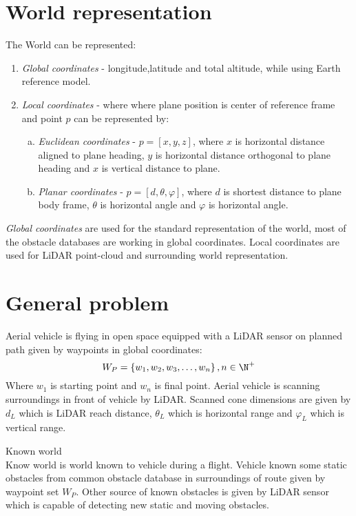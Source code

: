\section{World representation}
The World can be represented:
\begin{enumerate}
    \item \textit {Global coordinates} - longitude,latitude and total altitude, while using Earth reference model.
    \item \textit {Local coordinates} - where where plane position is center of reference frame and point $p$ can be represented by:
    \begin{enumerate}[a.]
        \item \textit{Euclidean coordinates} - $p = [x,y,z]$, where $x$ is horizontal distance aligned to plane heading, $y$ is horizontal distance orthogonal to plane heading and $x$ is vertical distance to plane.
        \item \textit{Planar coordinates} - $p = [d, \theta, \varphi]$, where $d$ is shortest distance to plane body frame, $\theta$ is horizontal angle and $\varphi$ is horizontal angle.
    \end{enumerate}
\end{enumerate}

\textit{Global coordinates} are used for the standard representation of the world, most of the obstacle databases are working in global coordinates. Local coordinates are used for LiDAR point-cloud and surrounding world representation.


\section{General problem}
Aerial vehicle is flying in open space equipped with a LiDAR sensor on planned path given by waypoints in global coordinates:
\begin{equation}
    W_P = \left\{ w_1, w_2,w_3,\dots, w_n \right \}, n \in \N^+
\end{equation}
Where $w_1$ is starting point and $w_n$ is final point. Aerial vehicle is scanning surroundings in front of vehicle by LiDAR. Scanned cone dimensions are given by $d_L$ which is LiDAR reach distance, $\theta_L$ which is horizontal range and $\varphi_L$ which is vertical range. 

\begin{note}{Known world}
\\Know world is world known to vehicle during a flight. Vehicle known some static obstacles from common obstacle database in surroundings of route given by waypoint set $W_P$. Other source of known obstacles is given by LiDAR sensor which is capable of detecting new static and moving obstacles.
\end{note}



